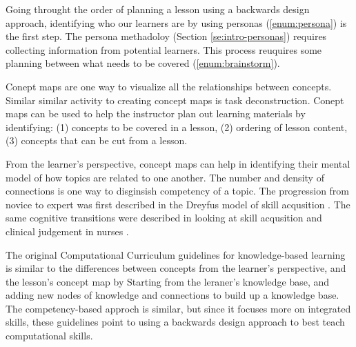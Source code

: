 \documentclass[010-intro.tex]{subfiles}
\begin{document}
        Going throught the order of planning a lesson using a backwards design approach,
        identifying who our learners are by using personas (\ref{enum:persona}) is the first step.
        The persona methadoloy (Section \ref{se:intro-personas}) requires collecting information from potential
        learners.
        This process reuquires some planning between what needs to be covered (\ref{enum:brainstorm}).

        Conept maps are one way to visualize all the relationships between concepts.
        Similar similar activity to creating concept maps is task deconstruction.
        Conept maps can be used to
        help the instructor plan out learning materials by identifying:
        (1) concepts to be covered in a lesson,
        (2) ordering of lesson content,
        (3) concepts that can be cut from a lesson.

        From the learner's perspective, concept maps can help in identifying their mental model of how topics
        are related to one another.
        The number and density of connections is one way to disginsish competency of a topic.
        The progression from novice to expert was first described in the Dreyfus model of skill acqusition
        \cite{dreyfus1980five, bennerUsingDreyfusModel2004}.
        The same cognitive transitions were described in looking at skill acqusition and clinical judgement in nurses
        \cite{bennerUsingDreyfusModel2004}.

        The original Computational Curriculum guidelines for knowledge-based learning is similar
        to the differences between concepts from the learner's perspective, and the lesson's concept map
        by Starting from the leraner's knowledge base, and adding new nodes of knowledge and connections to build up a knowledge base.
        The competency-based approch is similar, but since it focuses more on integrated skills,
        these guidelines point to using a backwards design approach to best teach computational skills.
\end{document}
